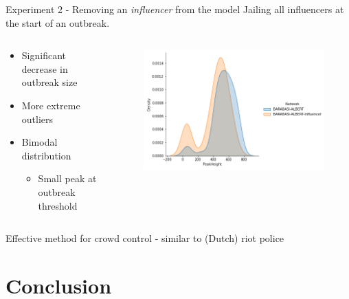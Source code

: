 \documentclass[10pt]{beamer}
\begin{document}
    \begin{frame}{Experiment 2 - Removing an \textit{influencer} from the model}
        Jailing all influencers at the start of an outbreak.
        \begin{columns}
            \begin{column}{0.3\textwidth}
                \begin{itemize}
                    \item Significant decrease in outbreak size
                    \item More extreme outliers
                    \item Bimodal distribution
                    \begin{itemize}
                        \item Small peak at outbreak threshold
                    \end{itemize}
                \end{itemize}
            \end{column}
            \begin{column}{0.7\textwidth}
                \begin{figure}
                    \centering
                    \includegraphics[scale=0.4]{pictures/network_comparison/only2density.png}
                \end{figure}
            \end{column}
        \end{columns}
        Effective method for crowd control - similar to (Dutch) riot police
    \end{frame}

    \section{Conclusion}
\end{document}
